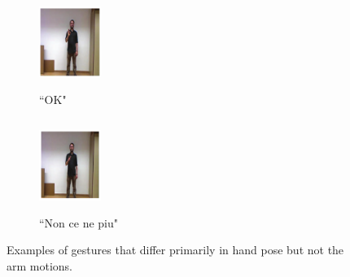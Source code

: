 \begin{figure}[t]
        \centering


        \begin{subfigure}[c]{.2\textwidth}
        \centering
                \includegraphics[width=2cm,height=3cm, trim=120 100 100 50, clip]{images/ok}
                \caption{``OK"}
        \end{subfigure}%
        \begin{subfigure}[c]{0.2\textwidth}
        \centering
                \includegraphics[width=2cm,height=3cm, trim=120 100 100 50, clip]{images/noncenepiu}
                \caption{``Non ce ne piu"}
        \end{subfigure}
  \caption{Examples of gestures that differ primarily in hand pose but not the arm motions.
  }\label{hand_differ}
\end{figure}

